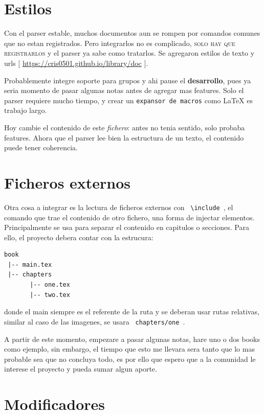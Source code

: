 \documentclass{article}
\begin{document}
  \section{ Estilos }

  Con el parser estable, muchos documentos aun se rompen por comandos comunes
  que no estan registrados. Pero integrarlos no es complicado, \textsc{solo hay
  que registrarlos} y el parser ya sabe como tratarlos. Se agregaron estilos de
  texto y urls [ \url{https://cris0501.github.io/library/doc} ].

  Probablemente integre soporte para grupos y ahi pause el \textbf{desarrollo},
  pues ya seria momento de pasar algunas notas antes de agregar mas features.
  Solo el parser requiere mucho tiempo, y crear un \texttt{expansor de macros}
  como LaTeX es trabajo largo.

  Hoy cambie el contenido de este \textit{fichero}: antes no tenia sentido,
  solo probaba features. Ahora que el parser lee bien la estructura de un texto,
  el contenido puede tener coherencia.

  \section{ Ficheros externos }
  
  Otra cosa a integrar es la lectura de ficheros externos con \texttt{ \backslash include },
  el comando que trae el contenido de otro fichero, una forma
  de injectar elementos. Principalmente se usa para separar el contenido en capitulos
  o secciones. Para ello, el proyecto debera contar con la estrucura:
  
\begin{verbatim}
book
 |-- main.tex
 |-- chapters
       |-- one.tex
       |-- two.tex
\end{verbatim}

  donde el main siempre es el referente de la ruta y se deberan usar rutas relativas,
  similar al caso de las imagenes, se usara \texttt{ chapters/one }.

  A partir de este momento, empezare a pasar algunas notas, hare uno o dos books como
  ejemplo, sin embargo, el tiempo que esto me llevara sera tanto que lo mas
  probable sea que no concluya todo, es por ello que espero que a la comunidad
  le interese el proyecto y pueda sumar algun aporte.

  \section{Modificadores}
  
\end{document}
